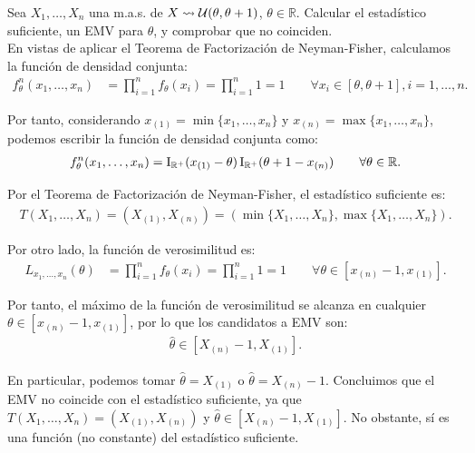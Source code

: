 \begin{ejemplo}
    Sea $X_1, \ldots, X_n$ una m.a.s. de $X \rightsquigarrow \mathcal{U}(\theta, \theta + 1)$, $\theta \in \mathbb{R}$. Calcular el estadístico suficiente, un EMV para $\theta$, y comprobar que no coinciden.\\

    En vistas de aplicar el Teorema de Factorización de Neyman-Fisher, calculamos la función de densidad conjunta:
    \begin{align*}
        f_{\theta}^n(x_1, \ldots, x_n) &= \prod_{i=1}^{n} f_{\theta}(x_i) = \prod_{i=1}^{n} 1 = 1 \qquad \forall x_i \in [\theta, \theta + 1], i = 1, \ldots, n.
    \end{align*}

    Por tanto, considerando $x_{(1)} = \min\{x_1, \ldots, x_n\}$ y $x_{(n)} = \max\{x_1, \ldots, x_n\}$, podemos escribir la función de densidad conjunta como:
    \begin{align*}
        f_{\theta}^n(x_1, \ldots, x_n) = \operatorname{I}_{\mathbb{R}^+}(x_{(1)}-\theta)\operatorname{I}_{\mathbb{R}^+}(\theta + 1 - x_{(n)}) \qquad \forall \theta \in \mathbb{R}.
    \end{align*}

    Por el Teorema de Factorización de Neyman-Fisher, el estadístico suficiente es:
    \begin{align*}
        T(X_1, \ldots, X_n) = (X_{(1)}, X_{(n)}) = (\min\{X_1, \ldots, X_n\}, \max\{X_1, \ldots, X_n\}).
    \end{align*}

    Por otro lado, la función de verosimilitud es:
    \begin{align*}
        L_{x_1, \ldots, x_n}(\theta) &= \prod_{i=1}^{n} f_{\theta}(x_i) = \prod_{i=1}^{n} 1 = 1 \qquad \forall \theta \in [x_{(n)} - 1, x_{(1)}].
    \end{align*}

    Por tanto, el máximo de la función de verosimilitud se alcanza en cualquier $\theta \in [x_{(n)} - 1, x_{(1)}]$, por lo que los candidatos a EMV son:
    \begin{align*}
        \hat{\theta} \in [X_{(n)} - 1, X_{(1)}].
    \end{align*}

    En particular, podemos tomar $\hat{\theta} = X_{(1)}$ o $\hat{\theta} = X_{(n)} - 1$. Concluimos que el EMV no coincide con el estadístico suficiente, ya que $T(X_1, \ldots, X_n) = (X_{(1)}, X_{(n)})$ y $\hat{\theta} \in [X_{(n)} - 1, X_{(1)}]$. No obstante, sí es una función (no constante) del estadístico suficiente.
\end{ejemplo}

